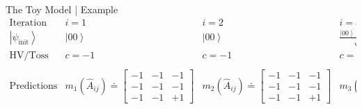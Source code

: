 \documentclass[final,hyperref={pdfpagelabels=false}]{beamer}
\begin{document}
\begin{frame}[t]
\begin{columns}[c]
\begin{column}{.69\textwidth}
\begin{columns}[c]
\begin{column}{.94\textwidth}
          \begin{block}{The Toy Model | Example}
            {\small
              \begin{equation}
                \begin{array}{c|ccc}
                  \text{Iteration} & i=1 & i=2 & i=3\\
                  \left|\psi_{\text{init}}\right\rangle  & \left|00\right\rangle  & \left|00\right\rangle  & \frac{\left|00\right\rangle +\left|11\right\rangle }{\sqrt{2}}\\
                  \text{HV/Toss} & c=-1 & c=-1 & c=+1\\
                  \\
                  \text{Predictions} & m_{1}(\hat{A}_{ij})\doteq\left[\begin{array}{ccc}
                                                                        -1 & -1 & -1\\
                                                                        -1 & -1 & -1\\
                                                                        -1 & -1 & +1
                                                                      \end{array}\right] & m_{2}(\hat{A}_{ij})\doteq\left[\begin{array}{ccc}
                                                                                                                            -1 & -1 & -1\\
                                                                                                                            -1 & -1 & -1\\
                                                                                                                            -1 & -1 & +1
                                                                                                                          \end{array}\right] & m_{3}(\hat{A}_{ij})\doteq\left[\begin{array}{ccc}
                                                                                                                                                                                +1 & +1 & +1\\
                                                                                                                                                                                +1 & +1 & -1\\

\end{array}
\end{array}
\end{equation}}
\end{block}
\end{column}
\end{columns}
\end{column}
\end{columns}
\end{frame}
\end{document}
